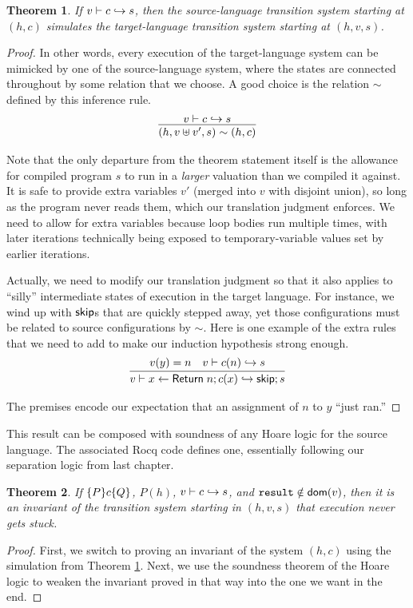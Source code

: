 \documentclass{amsbook}
\newtheorem{theorem}{Theorem}[chapter]
\theoremstyle{definition}
\theoremstyle{remark}
\numberwithin{section}{chapter}
\numberwithin{equation}{chapter}
\begin{document}
\begin{theorem}\label{dscompsim}
  If $v \vdash c \hookrightarrow s$, then the source-language transition system starting at $(h, c)$ simulates the target-language transition system starting at $(h, v, s)$.
\end{theorem}
\begin{proof}
  In other words, every execution of the target-language system can be mimicked by one of the source-language system, where the states are connected throughout by some relation that we choose.
  A good choice is the relation $\sim$ defined by this inference rule.
  $$\infer{(h, v \uplus v', s) \sim (h, c)}{
    \dscomp{v}{c}{s}
  }$$

  Note that the only departure from the theorem statement itself is the allowance for compiled program $s$ to run in a \emph{larger} valuation than we compiled it against.
  It is safe to provide extra variables $v'$ (merged into $v$ with disjoint union), so long as the program never reads them, which our translation judgment enforces.
  We need to allow for extra variables because loop bodies run multiple times, with later iterations technically being exposed to temporary-variable values set by earlier iterations.

  Actually, we need to modify our translation judgment so that it also applies to ``silly'' intermediate states of execution in the target language.
  For instance, we wind up with $\mathsf{skip}$s that are quickly stepped away, yet those configurations must be related to source configurations by $\sim$.
  Here is one example of the extra rules that we need to add to make our induction hypothesis strong enough.
  $$\infer{\dscomp{v}{x \leftarrow \mt{Return} \; n; c(x)}{\mt{skip}; s}}{
    v(y) = n
    & \dscomp{v}{c(n)}{s}
  }$$

  The premises encode our expectation that an assignment of $n$ to $y$ ``just ran.''
\end{proof}

This result can be composed with soundness of any Hoare logic for the source language.
The associated Rocq code defines one, essentially following our separation logic from last chapter.

\begin{theorem}
  If $\{P\} c \{Q\}$, $P(h)$, $v \vdash c \hookrightarrow s$, and $\texttt{result} \notin \mathsf{dom}(v)$, then it is an invariant of the transition system starting in $(h, v, s)$ that execution never gets stuck.
\end{theorem}
\begin{proof}
  First, we switch to proving an invariant of the system $(h, c)$ using the simulation from Theorem \ref{dscompsim}.
  Next, we use the soundness theorem of the Hoare logic to weaken the invariant proved in that way into the one we want in the end.
\end{proof}
\end{document}

